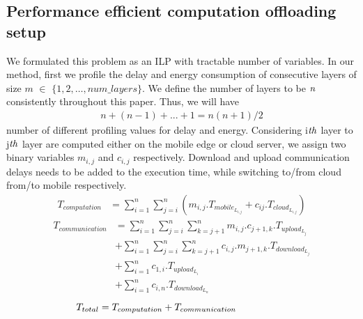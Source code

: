 \documentclass[conference,9pt]{IEEEtran}
\begin{document}
\subsection{Performance efficient computation offloading setup}
We formulated this problem as an ILP with tractable number of variables. In our method, first we profile the delay and energy consumption of consecutive layers of size $m$ $\in$ $\{1, 2,\dots, num\_layers\}$. We define the number of layers to be $\it{n}$ consistently throughout this paper. Thus, we will have
  \begin{equation}
      \begin{split}
n + (n-1) + ... + 1 = n(n+1)/2
  \end{split}
\end{equation}
number of different profiling values for delay and energy.
Considering i$\it{th}$ layer to j$\it{th}$ layer are computed either on the mobile edge or cloud server, we assign two binary variables $m_{i,j}$ and $c_{i,j}$ respectively. Download and upload communication delays needs to be added to the execution time, while switching to/from cloud from/to mobile respectively.
  \begin{equation}
      \begin{split}
T_{computation} &= \sum_{i=1}^{n}{\sum_{j=i}^{n}{
(m_{i,j}.T_{mobile_{L_{i,j}}} + c_{ij}.T_{cloud_{L_{i,j}}})
}}\label{eq: full_pass_comp}
  \end{split}
\end{equation}
  \begin{equation}
      \begin{split}
T_{communication} &= \sum_{i=1}^{n}{\sum_{j=i}^{n}{\sum_{k=j+1}^{n}{m_{i,j}.c_{j+1,k}.T_{upload_{L_j}}}}} \\
& + \sum_{i=1}^{n}{\sum_{j=i}^{n}{\sum_{k=j+1}^{n}{c_{i,j}.m_{j+1,k}.T_{download_{L_j}}}}} \\
& + \sum_{i=1}^{n}{c_{1,i}.T_{upload_{L_i}}} \\
& + \sum_{i=1}^{n}{c_{i,n}.T_{download_{L_n}}}\label{eq: full_pass_comm}
  \end{split}
\end{equation}
  \begin{equation}
T_{total} = T_{computation} + T_{communication}\thinspace\thinspace\thinspace\thinspace\thinspace\thinspace\thinspace\thinspace\thinspace\thinspace\thinspace\thinspace\thinspace\thinspace\thinspace\thinspace\thinspace\thinspace\thinspace\thinspace\thinspace\thinspace\thinspace\thinspace\thinspace\thinspace\thinspace\thinspace\thinspace\thinspace\thinspace
\end{equation}
\end{document}
